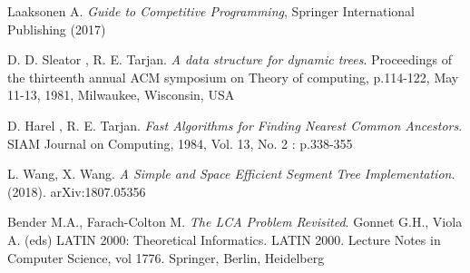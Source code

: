 \begin{thebibliography}{}

 Laaksonen A. \textit{Guide to Competitive Programming}, Springer International Publishing (2017)

 D. D. Sleator , R. E. Tarjan. \textit{A data structure for dynamic trees}. Proceedings of the thirteenth annual ACM symposium on Theory of computing, p.114-122, May 11-13, 1981, Milwaukee, Wisconsin, USA

 D. Harel , R. E. Tarjan. \textit{Fast Algorithms for Finding Nearest Common Ancestors}. SIAM Journal on Computing, 1984, Vol. 13, No. 2 : p.338-355

 L. Wang, X. Wang. \textit{A Simple and Space Efficient Segment Tree Implementation}. (2018). arXiv:1807.05356

 Bender M.A., Farach-Colton M. \textit{The LCA Problem Revisited}. Gonnet G.H., Viola A. (eds) LATIN 2000: Theoretical Informatics. LATIN 2000. Lecture Notes in Computer Science, vol 1776. Springer, Berlin, Heidelberg

\end{thebibliography}